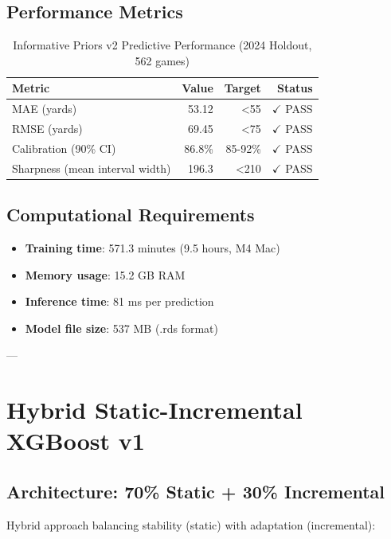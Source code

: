 \subsection{Performance Metrics}

\begin{table}[htbp]
\centering
\caption{Informative Priors v2 Predictive Performance (2024 Holdout, 562 games)}
\label{tab:informative-priors-performance}
\begin{tabular}{lrrr}
\toprule
\textbf{Metric} & \textbf{Value} & \textbf{Target} & \textbf{Status} \\
\midrule
MAE (yards) & 53.12 & <55 & $\checkmark$ PASS \\
RMSE (yards) & 69.45 & <75 & $\checkmark$ PASS \\
Calibration (90\% CI) & 86.8\% & 85-92\% & $\checkmark$ PASS \\
Sharpness (mean interval width) & 196.3 & <210 & $\checkmark$ PASS \\
\bottomrule
\end{tabular}
\end{table}

\subsection{Computational Requirements}

\begin{itemize}
\item \textbf{Training time}: 571.3 minutes (9.5 hours, M4 Mac)
\item \textbf{Memory usage}: 15.2 GB RAM
\item \textbf{Inference time}: 81 ms per prediction
\item \textbf{Model file size}: 537 MB (.rds format)
\end{itemize}

---

\section{Hybrid Static-Incremental XGBoost v1}

\subsection{Architecture: 70\% Static + 30\% Incremental}

Hybrid approach balancing stability (static) with adaptation (incremental):

